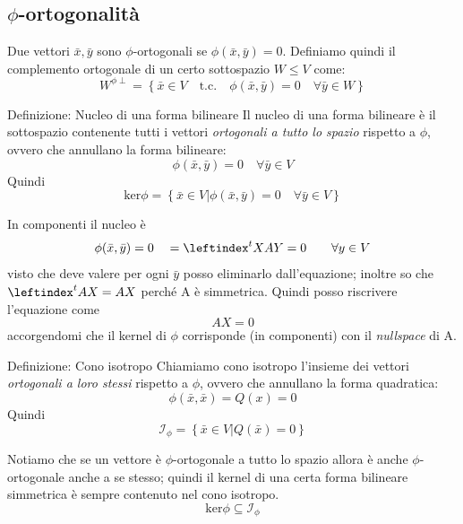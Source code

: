 \documentclass[x11names]{article}
\begin{document}
\subsection{$\phi$-ortogonalità}
Due vettori $\bar{x},\bar{y}$ sono $\phi$-ortogonali se $\phi (\bar{x},\bar{y}) = 0$. Definiamo quindi il complemento ortogonale di un certo sottospazio $W \leq V$ come:
\[
W^{\phi \perp} = \left\{\bar{x} \in V \quad \text{t.c.} \quad \phi(\bar{x},\bar{y}) = 0 \quad \forall \bar{y} \in W \right\}
\]

	\begin{center}
	\colorbox{myblue}{\begin{minipage}{5.75in}
			\begin{blues}{Definizione: Nucleo di una forma bilineare}
			Il nucleo di una forma bilineare è il sottospazio contenente tutti i vettori \textit{ortogonali a tutto lo spazio} rispetto a $\phi$, ovvero che annullano la forma bilineare:
			\[
			\phi(\bar{x},\bar{y}) = 0 \quad \forall \bar{y} \in V
			\]
			Quindi
			\[
			\text{ker}\phi = \left\{\bar{x} \in V | \phi(\bar{x},\bar{y}) = 0 \quad \forall \bar{y} \in V\right\}
			\]
			\end{blues}
	\end{minipage}}       
\end{center}

\noindent
In componenti il nucleo è 
\[
\phi(\bar{x},\bar{y}) = 0 \quad  = \leftindex^{t}{X}AY = 0 \qquad \forall y \in V
\]
visto che deve valere per ogni $\bar{y}$ posso eliminarlo dall'equazione; inoltre so che $\leftindex^{t}{A}X = AX$ perché A è simmetrica. Quindi posso riscrivere l'equazione come
\[
 AX = 0
\]
accorgendomi che il kernel di $\phi$ corrisponde (in componenti) con il \textit{nullspace} di A.
	\begin{center}
	\colorbox{myblue}{\begin{minipage}{5.75in}
			\begin{blues}{Definizione: Cono isotropo}
				Chiamiamo cono isotropo l'insieme dei vettori \textit{ortogonali a loro stessi} rispetto a $\phi$, ovvero che annullano la forma quadratica:
				\[
				\phi(\bar{x},\bar{x}) = Q(x) = 0
				\]
				Quindi
				\[
				\mathcal{I}_\phi = \left\{\bar{x} \in V | Q(\bar{x}) = 0 \right\}
				\]
			\end{blues}
	\end{minipage}}       
\end{center}
Notiamo che se un vettore è $\phi$-ortogonale a tutto lo spazio allora è anche $\phi$-ortogonale anche a se stesso; quindi il kernel di una certa forma bilineare simmetrica è sempre contenuto nel cono isotropo.
\[
\text{ker}\phi \subseteq \mathcal{I}_{\phi}
\]
\end{document}
